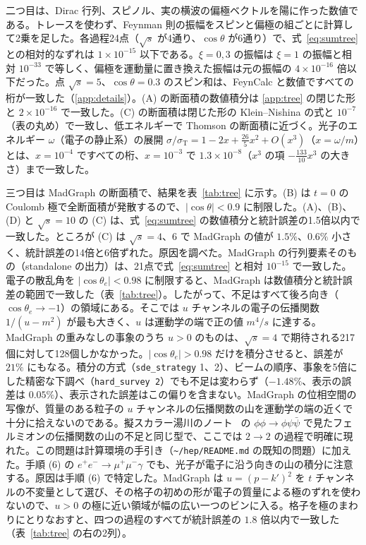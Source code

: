 \documentclass[a4paper,10pt]{ltjsarticle}
\begin{document}
二つ目は、Dirac 行列、スピノル、実の横波の偏極ベクトルを陽に作った数値である。トレースを使わず、Feynman 則の振幅をスピンと偏極の組ごとに計算して2乗を足した。各過程24点（$\sqrt s$ が4通り、$\cos\theta$ が6通り）で、式~\eqref{eq:sumtree} との相対的なずれは $1\times10^{-15}$ 以下である。$\xi=0,3$ の振幅は $\xi=1$ の振幅と相対 $10^{-33}$ で等しく、偏極を運動量に置き換えた振幅は元の振幅の $4\times10^{-16}$ 倍以下だった。点 $\sqrt s=5$、$\cos\theta=0.3$ のスピン和は、FeynCalc と数値ですべての桁が一致した（\ref{app:details}）。(A) の断面積の数値積分は \ref{app:tree} の閉じた形と $2\times10^{-16}$ で一致した。(C) の断面積は閉じた形の Klein--Nishina の式と $10^{-7}$（表の丸め）で一致し、低エネルギーで Thomson の断面積に近づく。光子のエネルギー $\omega$（電子の静止系）の展開 $\sigma/\sigma_{\mathrm T}=1-2x+\frac{26}{5}x^2+O(x^3)$（$x=\omega/m$）とは、$x=10^{-4}$ ですべての桁、$x=10^{-3}$ で $1.3\times10^{-8}$（$x^3$ の項 $-\frac{133}{10}x^3$ の大きさ）まで一致した。

三つ目は MadGraph の断面積で、結果を表~\ref{tab:tree} に示す。(B) は $t=0$ の Coulomb 極で全断面積が発散するので、$|\cos\theta|<0.9$ に制限した。(A)、(B)、(D) と $\sqrt s=10$ の (C) は、式~\eqref{eq:sumtree} の数値積分と統計誤差の1.5倍以内で一致した。ところが (C) は $\sqrt s=4$、$6$ で MadGraph の値が $1.5\%$、$0.6\%$ 小さく、統計誤差の14倍と6倍ずれた。原因を調べた。MadGraph の行列要素そのもの（standalone の出力）は、21点で式~\eqref{eq:sumtree} と相対 $10^{-15}$ で一致した。電子の散乱角を $|\cos\theta_e|<0.98$ に制限すると、MadGraph は数値積分と統計誤差の範囲で一致した（表~\ref{tab:tree}）。したがって、不足はすべて後ろ向き（$\cos\theta_e\to-1$）の領域にある。そこでは $u$ チャンネルの電子の伝播関数 $1/(u-m^2)$ が最も大きく、$u$ は運動学の端で正の値 $m^4/s$ に達する。MadGraph の重みなしの事象のうち $u>0$ のものは、$\sqrt s=4$ で期待される217個に対して128個しかなかった。$|\cos\theta_e|>0.98$ だけを積分させると、誤差が $21\%$ にもなる。積分の方式（\texttt{sde\_strategy} 1、2）、ビームの順序、事象を5倍にした精密な下調べ（\texttt{hard\_survey 2}）でも不足は変わらず（$-1.48\%$、表示の誤差は $0.05\%$）、表示された誤差はこの偏りを含まない。MadGraph の位相空間の写像が、質量のある粒子の $u$ チャンネルの伝播関数の山を運動学の端の近くで十分に拾えないのである。擬スカラー湯川のノート~\cite{yukawanote} の $\phi\phi\to\phi\psi\bar\psi$ で見たフェルミオンの伝播関数の山の不足と同じ型で、ここでは $2\to2$ の過程で明確に現れた。この問題は計算環境の手引き（\nolinkurl{~/hep/README.md} の既知の問題）に加えた。手順 (6) の $e^+e^-\to\mu^+\mu^-\gamma$ でも、光子が電子に沿う向きの山の積分に注意する。原因は手順 (6) で特定した。MadGraph は $u=(p-k')^2$ を $t$ チャンネルの不変量として選び、その格子の初めの形が電子の質量による極のずれを使わないので、$u>0$ の極に近い領域が幅の広い一つのビンに入る。格子を極のまわりにとりなおすと、四つの過程のすべてが統計誤差の $1.8$ 倍以内で一致した（表~\ref{tab:tree} の右の2列）。
\end{document}
